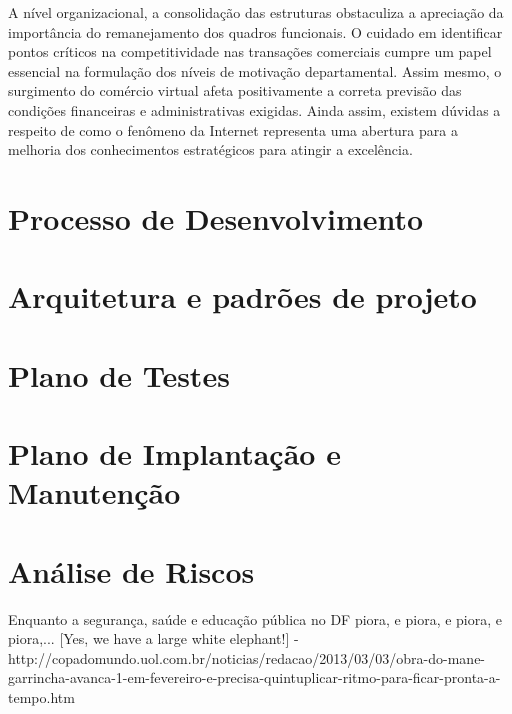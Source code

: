 \documentclass[12pt,a4paper]{report}
\begin{document}
A nível organizacional, a consolidação das estruturas obstaculiza a apreciação da importância do remanejamento dos quadros funcionais. O cuidado em identificar pontos críticos na competitividade nas transações comerciais cumpre um papel essencial na formulação dos níveis de motivação departamental. Assim mesmo, o surgimento do comércio virtual afeta positivamente a correta previsão das condições financeiras e administrativas exigidas. Ainda assim, existem dúvidas a respeito de como o fenômeno da Internet representa uma abertura para a melhoria dos conhecimentos estratégicos para atingir a excelência.

\chapter{Processo de Desenvolvimento}


\chapter{Arquitetura e padrões de projeto}


\chapter{Plano de Testes}

\chapter{Plano de Implantação e Manutenção}

\chapter{Análise de Riscos}
Enquanto a segurança, saúde e educação pública no DF piora, e piora, e piora, e piora,... [Yes, we have a large white elephant!] - http://copadomundo.uol.com.br/noticias/redacao/2013/03/03/obra-do-mane-garrincha-avanca-1-em-fevereiro-e-precisa-quintuplicar-ritmo-para-ficar-pronta-a-tempo.htm
\end{document}
